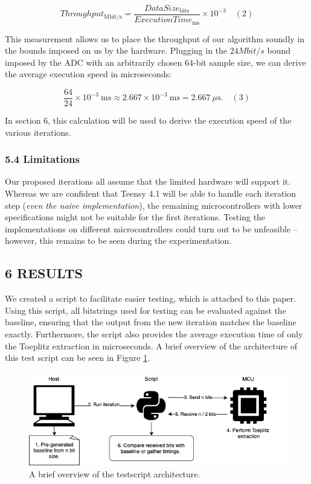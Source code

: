 \[
Throughput_\mathrm{Mbit/s}
= \frac{DataSize_\mathrm{bits}}{ExecutionTime_\mathrm{ms}}
\times 10^{-3}
\phantom{12}(2)
\]

This measurement allows us to place the throughput of our algorithm soundly in the bounds imposed on us by the hardware. Plugging in the \(24 Mbit/s\) bound imposed by the ADC with an arbitrarily chosen 64-bit sample size, we can derive the average execution speed in microseconds:

\[
\frac{64}{24}\times10^{-3}\ \mathrm{ms}
\approx 2.667\times10^{-3}\ \mathrm{ms}
=2.667\ \mu\mathrm{s}.
\phantom{12}(3)
\]

In section 6, this calculation will be used to derive the execution speed of the various iterations.

\hypertarget{limitations}{%
\subsubsection{5.4 Limitations}\label{limitations}}

Our proposed iterations all assume that the limited hardware will support it. Whereas we are confident that Teensy 4.1 will be able to handle each iteration step (\emph{even the naive implementation}), the remaining microcontrollers with lower specifications might not be suitable for the first iterations. Testing the implementations on different microcontrollers could turn out to be unfeasible -- however, this remains to be seen during the experimentation.

\hypertarget{results}{%
\subsection{6 RESULTS}\label{results}}

We created a script to facilitate easier testing, which is attached to this paper. Using this script, all bitstrings used for testing can be evaluated against the baseline, ensuring that the output from the new iteration matches the baseline exactly. Furthermore, the script also provides the average execution time of only the Toeplitz extraction in microseconds. A brief overview of the architecture of this test script can be seen in Figure \ref{fig:testscript-architecture}.

\begin{figure}[ht] \centering
\includegraphics[width=\textwidth]{img/testscript.png} \caption{A brief overview
of the testscript architecture.} \label{fig:testscript-architecture}
\end{figure}

